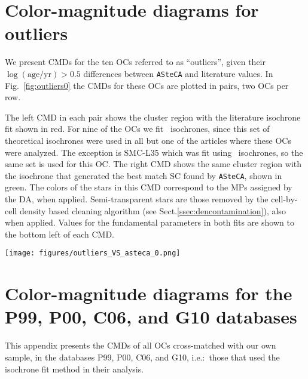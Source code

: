\documentclass{aa}
\begin{document}
\begin{appendix}

\section{Color-magnitude diagrams for outliers}
\label{apdx:outliers}

We present CMDs for the ten OCs referred to as ``outliers'', given their
$\log\mathrm{(age/yr)}{>}0.5$ differences between \texttt{ASteCA} and literature
values.
In Fig.~\ref{fig:outliers0} the CMDs for these OCs are plotted in pairs, two OCs
per row.

The left CMD in each pair shows the cluster region with the literature isochrone
fit shown in red. For nine of the OCs we fit~\cite{Marigo_2008} isochrones,
since this set of theoretical isochrones were used in all but one of the
articles where these OCs were analyzed. The exception is SMC-L35 which was fit
using~\cite{Girardi_2002} isochrones, so the same set is used for this OC.\@
%
The right CMD shows the same cluster region with the isochrone
that generated the best match SC found by \texttt{ASteCA}, shown in green.
The colors of the stars in this CMD correspond to the MPs assigned by the DA,
when applied.
Semi-transparent stars are those removed by the cell-by-cell density based
cleaning algorithm  (see Sect.\ref{ssec:dencontamination}), also when applied.
%
Values for the fundamental parameters in both fits are shown to the bottom left
of each CMD.\@

\begin{figure*}
\texttt{[image: figures/outliers\_VS\_asteca\_0.png]}
\caption{CMDs for the outliers set. See description of the plots in
Appendix~\ref{apdx:outliers}.}
\label{fig:outliers0}
\end{figure*}
\clearpage





\section{Color-magnitude diagrams for the P99, P00, C06, and G10 databases}
\label{apdx:databases}

This appendix presents the CMDs of all OCs cross-matched with our own
sample, in the databases P99, P00, C06, and G10, i.e.:\ those that used the
isochrone fit method in their analysis.


\end{appendix}
\end{document}
